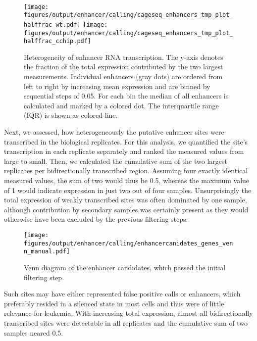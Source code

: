 \begin{figure}[!htb]
	{\Large \hfill \dnmtwt \hfill \hspace{2cm} \dnmtchip \hfill} \\
	\centering
	\texttt{[image: figures/output/enhancer/calling/cageseq\_enhancers\_tmp\_plot\_halffrac\_wt.pdf]} 
	\texttt{[image: figures/output/enhancer/calling/cageseq\_enhancers\_tmp\_plot\_halffrac\_cchip.pdf]} 
	\caption{Heterogeneity of enhancer RNA transcription. The y-axis denotes the fraction of the total expression contributed by the two largest measurements. Individual enhancers (gray dots) are ordered from left to right by increasing mean expression and are binned by sequential steps of \num{0.05}. For each bin the median of all enhancers is calculated and marked by a colored dot. The interquartile range (IQR) is shown as colored line.}
	\label{fig:enhancers:cageseqhalffrac}
\end{figure}

Next, we assessed, how heterogeneously the putative enhancer sites were transcribed in the biological replicates. For this analysis, we quantified the site's transcription in each replicate separately and ranked the measured values from large to small. Then, we calculated the cumulative sum of the two largest replicates per bidirectionally transcribed region. Assuming four exactly identical measured values, the sum of two would thus be \num{0.5}, whereas the maximum value of \num{1} would indicate expression in just two out of four samples. Unsurprisingly the total expression of weakly transcribed sites was often dominated by one sample, although contribution by secondary samples was certainly present as they would otherwise have been excluded by the previous filtering steps.

\begin{figure}[!htb]
	\centering
	\texttt{[image: figures/output/enhancer/calling/enhancercanidates\_genes\_venn\_manual.pdf]} 
	\caption{Venn diagram of the enhancer candidates, which passed the initial filtering step.}
	\label{fig:enhancers:enhancercanidates_venn_manual}
\end{figure}

Such sites may have either represented false positive calls or enhancers, which preferably resided in a silenced state in most cells  and thus were of little relevance for leukemia. With increasing total expression, almost all bidirectionally transcribed sites were detectable in all replicates and the cumulative sum of two samples neared \num{0.5}.

